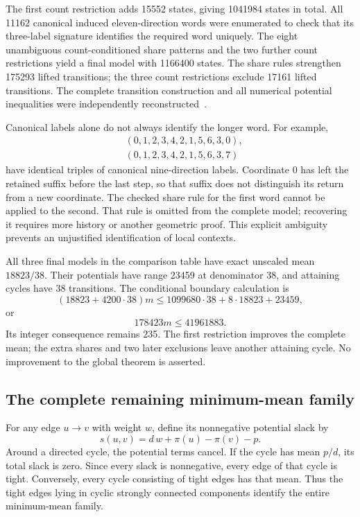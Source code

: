 \documentclass[11pt,a4paper]{article}
\theoremstyle{definition}
\theoremstyle{remark}
\begin{document}
The first count restriction adds 15552 states, giving 1041984 states in total. All 11162 canonical induced eleven-direction words were enumerated to check that its three-label signature identifies the required word uniquely. The eight unambiguous count-conditioned share patterns and the two further count restrictions yield a final model with 1166400 states. The share rules strengthen 175293 lifted transitions; the three count restrictions exclude 17161 lifted transitions. The complete transition construction and all numerical potential inequalities were independently reconstructed~\cite{newmodelarchive}.

Canonical labels alone do not always identify the longer word. For example,
\[
\begin{split}
&(0,1,2,3,4,2,1,5,6,3,0),\\
&(0,1,2,3,4,2,1,5,6,3,7)
\end{split}
\]
have identical triples of canonical nine-direction labels. Coordinate 0 has left the retained suffix before the last step, so that suffix does not distinguish its return from a new coordinate. The checked share rule for the first word cannot be applied to the second. That rule is omitted from the complete model; recovering it requires more history or another geometric proof. This explicit ambiguity prevents an unjustified identification of local contexts.

All three final models in the comparison table have exact unscaled mean $18823/38$. Their potentials have range 23459 at denominator 38, and attaining cycles have 38 transitions. The conditional boundary calculation is
\[
(18823+4200\cdot38)m
\le1099680\cdot38+8\cdot18823+23459,
\]
or
\begin{equation}\label{eq:current-conditional-bound}
178423m\le41961883.
\end{equation}
Its integer consequence remains 235. The first restriction improves the complete mean; the extra shares and two later exclusions leave another attaining cycle. No improvement to the global theorem is asserted.

\subsection{The complete remaining minimum-mean family}
For any edge $u\to v$ with weight $w$, define its nonnegative potential slack by
\[
s(u,v)=d\,w+\pi(u)-\pi(v)-p.
\]
Around a directed cycle, the potential terms cancel. If the cycle has mean $p/d$, its total slack is zero. Since every slack is nonnegative, every edge of that cycle is tight. Conversely, every cycle consisting of tight edges has that mean. Thus the tight edges lying in cyclic strongly connected components identify the entire minimum-mean family.
\end{document}
